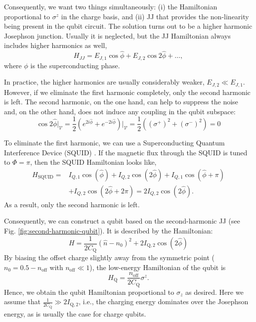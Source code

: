 \documentclass[reprint, aps, prx, amsmath, amssymb, longbibliography, superscriptaddress]{revtex4-2}
\begin{document}
Consequently, we want two things simultaneously: (i) the Hamiltonian proportional to $\sigma^z$ in the charge basis, and (ii) JJ that provides the non-linearity being present in the qubit circuit. The solution turns out to be a higher harmonic Josephson junction. Usually it is neglected, but the JJ Hamiltonian always includes higher harmonics as well,
\begin{equation}
    H_{JJ} = E_{J,1} \cos{\hat \phi} + E_{J,2} \cos{2\hat \phi} + \dots,
\end{equation}
where $\phi$ is the superconducting phase.

In practice, the higher harmonics are usually considerably weaker, $E_{J,2} \ll E_{J,1}$. However, if we eliminate the first harmonic completely, only the second harmonic is left. The second harmonic, on the one hand, can help to suppress the noise and, on the other hand, does not induce any coupling in the qubit subspace:
\begin{equation}
    \cos{2\hat \phi}\bigg|_{\mathcal{V}} = \frac{1}{2}\left(e^{2i\hat\phi} + e^{-2i\hat \phi}\right)\bigg|_{\mathcal{V}}=\frac{1}{2}\left((\sigma^+)^2 + (\sigma^-)^2\right) =0
\end{equation}

To eliminate the first harmonic, we can use a Superconducting Quantum Interference Device (SQUID) \cite{valentini_parityconserving_2024}. If the magnetic flux through the SQUID is tuned to $\Phi = \pi$, then the SQUID Hamiltonian looks like,
\begin{equation}
\begin{aligned}
    H_{\text{SQUID}} = &I_{Q,1} \cos(\hat \phi) + I_{Q,2} \cos(2\hat \phi) + I_{Q,1} \cos(\hat \phi + \pi) \\
    &+ I_{Q,2} \cos(2\hat \phi + 2\pi) = 2 I_{Q,2} \cos(2\hat \phi).
\end{aligned}
\end{equation}
As a result, only the second harmonic is left.

Consequently, we can construct a qubit based on the second-harmonic JJ (see Fig. \ref{fig:second-harmonic-qubit}). It is described by the Hamiltonian:
\begin{equation}
\label{eq:second-harmonic-qubit}
    H = \frac{1}{2C_{\text{Q}}} (\hat n - n_0)^2 + 2 I_{\text{Q},2} \cos(2\hat\phi)
\end{equation}
By biasing the offset charge slightly away from the symmetric point ($n_0 = 0.5 - n_{\mathrm{off}}$ with $n_{\mathrm{off}} \ll 1$), the low-energy Hamiltonian of the qubit is
\begin{equation}
    H_{\text{Q}} = \frac{n_{\mathrm{off}}}{2 C_{\text{Q}}} \sigma^z.
\end{equation}
Hence, we obtain the qubit Hamiltonian proportional to $\sigma_z$ as desired. Here we assume that $\frac{1}{2C_{\text{Q}}} \gg 2 I_{\text{Q},2}$, i.e., the charging energy dominates over the Josephson energy, as is usually the case for charge qubits.
\end{document}

